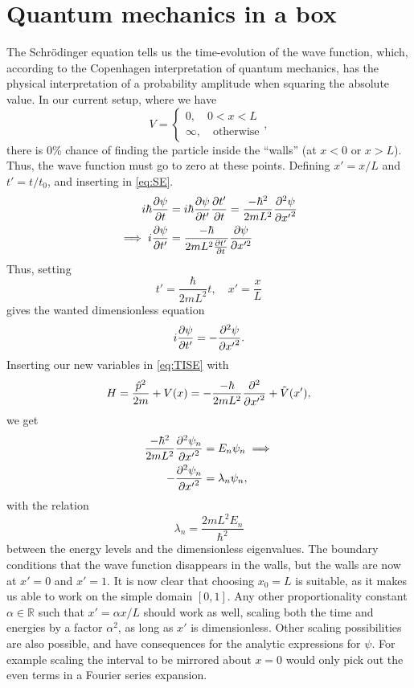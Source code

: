 \section{Quantum mechanics in a box}

The Schrödinger equation tells us the time-evolution of the wave function, which, according to the Copenhagen interpretation of quantum mechanics, has the physical interpretation of a probability amplitude when squaring the absolute value. In our current setup, where we have
\begin{equation} 
V = \begin{cases}
0,\quad 0<x<L \\
\infty,\quad \text{otherwise}
\end{cases},
\end{equation}
there is 0\% chance of finding the particle inside the ``walls'' (at $x<0$ or $x> L$). Thus, the wave function must go to zero at these points. Defining $x' = x/L$ and $t'=t/t_0$, and inserting in \cref{eq:SE}.
\begin{align*} 
i\hbar\pdv{\psi}{t} &= i\hbar\pdv{\psi}{t'}\pdv{t'}{t}= \frac{-\hbar^2}{2mL^2}\pdv[2]{\psi}{{x'}}\\
\implies i\pdv{\psi}{t'} &= \frac{-\hbar}{2mL^2 \pdv{t'}{t}}\pdv{\psi}{x'^2}
\end{align*}
Thus, setting
\begin{equation}
\label{eq:normalized_stuff}
t' = \frac{\hbar}{2mL^2}t,\quad x' = \frac{x}{L}
\end{equation}
gives the wanted dimensionless equation
\begin{equation}
\label{eq:SE_dimensionless}
i\pdv{\psi}{t'} = -\pdv[2]{\psi}{{x'}}.
\end{equation}
Inserting our new variables in \cref{eq:TISE} with \[H = \frac{\hat p^2}{2m} + V(x) =  -\frac{-\hbar}{2mL^2} \pdv[2]{{x'}} + \tilde{V}(x'),\] we get
\begin{align} 
\frac{-\hbar^2}{2mL^2}\pdv[2]{\psi_n}{{x'}} &= E_n\psi_n \implies \nonumber\\
\label{eq:eig}
-\pdv[2]{\psi_n}{{x'}} &= \lambda_n\psi_n,
\end{align}
with the relation 
\begin{equation} 
\label{eq:energy_conversion}
\lambda_n = \frac{2mL^2 E_n}{\hbar^2}
\end{equation}
between the energy levels and the dimensionless eigenvalues. The boundary conditions that the wave function disappears in the walls, but the walls are now at $x' = 0$ and $x' = 1$. It is now clear that choosing $x_0 = L$ is suitable, as it makes us able to work on the simple domain $[0,1]$. Any other proportionality constant $\alpha\in \mathbb{R}$ such that $x' = \alpha x/ L$ should work as well, scaling both the time and energies by a factor $\alpha^2 $, as long as $x'$ is dimensionless. Other scaling possibilities are also possible, and have consequences for the analytic expressions for $\psi$. For example scaling the interval to be mirrored about $x = 0$ would only pick out the even terms in a Fourier series expansion.


